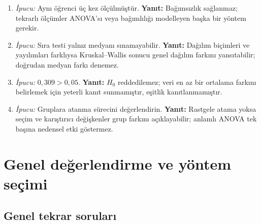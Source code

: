 \begin{enumerate}[leftmargin=*,itemsep=5pt]
varyansı nedeniyle Welch ANOVA'yı uygun kılar.
\item \emph{İpucu:} Aynı öğrenci üç kez ölçülmüştür.
\textbf{Yanıt:} Bağımsızlık sağlanmaz; tekrarlı ölçümler ANOVA'sı veya
bağımlılığı modelleyen başka bir yöntem gerekir.
\item \emph{İpucu:} Sıra testi yalnız medyanı sınamayabilir.
\textbf{Yanıt:} Dağılım biçimleri ve yayılımları farklıysa Kruskal--Wallis
sonucu genel dağılım farkını yansıtabilir; doğrudan medyan farkı denemez.
\item \emph{İpucu:} $0{,}309>0{,}05$.
\textbf{Yanıt:} $H_0$ reddedilemez; veri en az bir ortalama farkını
belirlemek için yeterli kanıt sunmamıştır, eşitlik kanıtlanmamıştır.
\item \emph{İpucu:} Gruplara atanma sürecini değerlendirin.
\textbf{Yanıt:} Rastgele atama yoksa seçim ve karıştırıcı değişkenler grup
farkını açıklayabilir; anlamlı ANOVA tek başına nedensel etki göstermez.
\end{enumerate}
\fi

\section{Genel değerlendirme ve yöntem seçimi}

\subsection*{Genel tekrar soruları}

